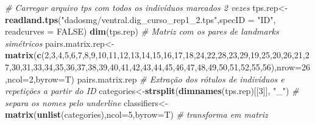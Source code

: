 \documentclass[
]{book}
\newenvironment{Shaded}{\begin{snugshade}}{\end{snugshade}}
\newcommand{\AttributeTok}[1]{\textcolor[rgb]{0.13,0.29,0.53}{#1}}
\newcommand{\CommentTok}[1]{\textcolor[rgb]{0.56,0.35,0.01}{\textit{#1}}}
\newcommand{\ConstantTok}[1]{\textcolor[rgb]{0.56,0.35,0.01}{#1}}
\newcommand{\DecValTok}[1]{\textcolor[rgb]{0.00,0.00,0.81}{#1}}
\newcommand{\FunctionTok}[1]{\textcolor[rgb]{0.13,0.29,0.53}{\textbf{#1}}}
\newcommand{\NormalTok}[1]{#1}
\newcommand{\OtherTok}[1]{\textcolor[rgb]{0.56,0.35,0.01}{#1}}
\newcommand{\StringTok}[1]{\textcolor[rgb]{0.31,0.60,0.02}{#1}}
\begin{document}
\begin{Shaded}
\begin{Highlighting}[]
\CommentTok{\# Carregar arquivo tps com todos os indivíduos marcados 2 vezes}
\NormalTok{tps.rep}\OtherTok{\textless{}{-}}\FunctionTok{readland.tps}\NormalTok{(}\StringTok{"dadosmg/ventral.dig\_curso\_rep1\_2.tps"}\NormalTok{,}\AttributeTok{specID =} \StringTok{"ID"}\NormalTok{, }\AttributeTok{readcurves =} \ConstantTok{FALSE}\NormalTok{) }
\FunctionTok{dim}\NormalTok{(tps.rep)}
\CommentTok{\# Matriz com os pares de landmarks simétricos}
\NormalTok{pairs.matrix.rep}\OtherTok{\textless{}{-}}\FunctionTok{matrix}\NormalTok{(}\FunctionTok{c}\NormalTok{(}\DecValTok{2}\NormalTok{,}\DecValTok{3}\NormalTok{,}\DecValTok{4}\NormalTok{,}\DecValTok{5}\NormalTok{,}\DecValTok{6}\NormalTok{,}\DecValTok{7}\NormalTok{,}\DecValTok{8}\NormalTok{,}\DecValTok{9}\NormalTok{,}\DecValTok{10}\NormalTok{,}\DecValTok{11}\NormalTok{,}\DecValTok{12}\NormalTok{,}\DecValTok{13}\NormalTok{,}\DecValTok{14}\NormalTok{,}\DecValTok{15}\NormalTok{,}\DecValTok{16}\NormalTok{,}\DecValTok{17}\NormalTok{,}\DecValTok{18}\NormalTok{,}\DecValTok{24}\NormalTok{,}\DecValTok{22}\NormalTok{,}\DecValTok{28}\NormalTok{,}\DecValTok{23}\NormalTok{,}\DecValTok{29}\NormalTok{,}\DecValTok{19}\NormalTok{,}\DecValTok{25}\NormalTok{,}\DecValTok{20}\NormalTok{,}\DecValTok{26}\NormalTok{,}\DecValTok{21}\NormalTok{,}\DecValTok{27}\NormalTok{,}\DecValTok{30}\NormalTok{,}\DecValTok{31}\NormalTok{,}\DecValTok{33}\NormalTok{,}\DecValTok{34}\NormalTok{,}\DecValTok{35}\NormalTok{,}\DecValTok{36}\NormalTok{,}\DecValTok{37}\NormalTok{,}\DecValTok{38}\NormalTok{,}\DecValTok{39}\NormalTok{,}\DecValTok{40}\NormalTok{,}\DecValTok{41}\NormalTok{,}\DecValTok{42}\NormalTok{,}\DecValTok{43}\NormalTok{,}\DecValTok{44}\NormalTok{,}\DecValTok{45}\NormalTok{,}\DecValTok{46}\NormalTok{,}\DecValTok{47}\NormalTok{,}\DecValTok{48}\NormalTok{,}\DecValTok{49}\NormalTok{,}\DecValTok{50}\NormalTok{,}\DecValTok{51}\NormalTok{,}\DecValTok{52}\NormalTok{,}\DecValTok{55}\NormalTok{,}\DecValTok{56}\NormalTok{),}\AttributeTok{nrow=}\DecValTok{26}\NormalTok{,}\AttributeTok{ncol=}\DecValTok{2}\NormalTok{,}\AttributeTok{byrow=}\NormalTok{T) }
\NormalTok{pairs.matrix.rep}
\CommentTok{\# Extração dos rótulos de indivíduos e repetições a partir do ID}
\NormalTok{categories}\OtherTok{\textless{}{-}}\FunctionTok{strsplit}\NormalTok{(}\FunctionTok{dimnames}\NormalTok{(tps.rep)[[}\DecValTok{3}\NormalTok{]], }\StringTok{"\_"}\NormalTok{) }\CommentTok{\# separa os nomes pelo underline}
\NormalTok{classifiers}\OtherTok{\textless{}{-}}\FunctionTok{matrix}\NormalTok{(}\FunctionTok{unlist}\NormalTok{(categories),}\AttributeTok{ncol=}\DecValTok{5}\NormalTok{,}\AttributeTok{byrow=}\NormalTok{T) }\CommentTok{\# transforma em matriz}

\end{Highlighting}
\end{Shaded}
\end{document}
